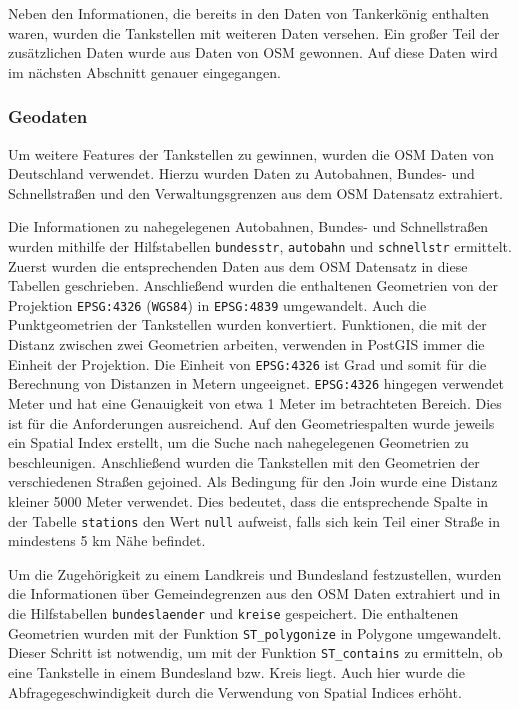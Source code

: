 \documentclass[
ngerman          %
,a4paper          %
,11pt
,pdftex
]{report}
\begin{document}
Neben den Informationen, die bereits in den Daten von Tankerkönig enthalten waren, wurden die Tankstellen mit weiteren Daten versehen. Ein großer Teil der zusätzlichen Daten wurde aus Daten von \ac{OSM} gewonnen. Auf diese Daten wird im nächsten Abschnitt genauer eingegangen.

\subsubsection{Geodaten}

Um weitere Features der Tankstellen zu gewinnen, wurden die \ac{OSM} Daten von Deutschland verwendet. Hierzu wurden Daten zu Autobahnen, Bundes- und Schnellstraßen und den Verwaltungsgrenzen aus dem \ac{OSM} Datensatz extrahiert.

Die Informationen zu nahegelegenen Autobahnen, Bundes- und Schnellstraßen wurden mithilfe der Hilfstabellen \texttt{bundesstr}, \texttt{autobahn} und \texttt{schnellstr} ermittelt. Zuerst wurden die entsprechenden Daten aus dem \ac{OSM} Datensatz in diese Tabellen geschrieben. Anschließend wurden die enthaltenen Geometrien von der Projektion \texttt{EPSG:4326} (\texttt{WGS84}) in \texttt{EPSG:4839} umgewandelt. Auch die Punktgeometrien der Tankstellen wurden konvertiert. Funktionen, die mit der Distanz zwischen zwei Geometrien arbeiten, verwenden in PostGIS immer die Einheit der Projektion. Die Einheit von \texttt{EPSG:4326} ist Grad und somit für die Berechnung von Distanzen in Metern ungeeignet. \texttt{EPSG:4326} hingegen verwendet Meter und hat eine Genauigkeit von etwa 1 Meter im betrachteten Bereich. Dies ist für die Anforderungen ausreichend. Auf den Geometriespalten wurde jeweils ein Spatial Index erstellt, um die Suche nach nahegelegenen Geometrien zu beschleunigen. Anschließend wurden die Tankstellen mit den Geometrien der verschiedenen Straßen gejoined. Als Bedingung für den Join wurde eine Distanz kleiner 5000 Meter verwendet. Dies bedeutet, dass die entsprechende Spalte in der Tabelle \texttt{stations} den Wert \texttt{null} aufweist, falls sich kein Teil einer Straße in mindestens 5 km Nähe befindet.

Um die Zugehörigkeit zu einem Landkreis und Bundesland festzustellen, wurden die Informationen über Gemeindegrenzen aus den \ac{OSM} Daten extrahiert und in die Hilfstabellen \texttt{bundeslaender} und \texttt{kreise} gespeichert. Die enthaltenen Geometrien wurden mit der Funktion \texttt{ST\_polygonize} in Polygone umgewandelt. Dieser Schritt ist notwendig, um mit der Funktion \texttt{ST\_contains} zu ermitteln, ob eine Tankstelle in einem Bundesland bzw. Kreis liegt. Auch hier wurde die Abfragegeschwindigkeit durch die Verwendung von Spatial Indices erhöht.
\end{document}
